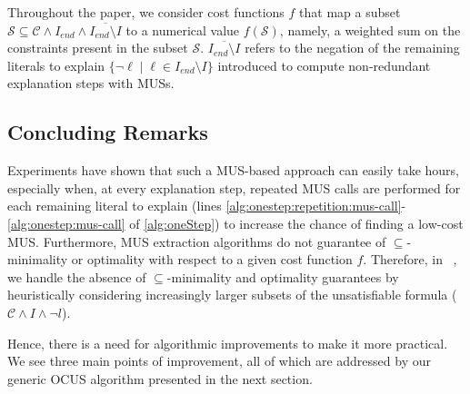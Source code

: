 \documentclass[twoside,11pt]{article}
\newcommand\citet[1]{\citeauthor{#1}~\citeyear{#1}}
\newcommand\m[1]{\mathcal{#1}}
\newcommand\Iend{\ensuremath{I_\mathit{end} }\xspace}
\newcommand\formulac{\ensuremath{\m{C} }\xspace}
\begin{document}
Throughout the paper, we consider cost functions $f$ that map a subset $\m{S} \subseteq \formulac \wedge \Iend \wedge \overline{\Iend \setminus I}$ to a numerical value $f(\m{S})$, namely, a weighted sum on the constraints present in the subset $\m{S}$.  $\overline{\Iend \setminus I} $ refers to the negation of the remaining literals to explain $\{\lnot \ell \mid \ell \in \Iend \setminus I\}$ introduced to compute non-redundant explanation steps with MUSs.




\subsection{Concluding Remarks}\label{sec:motivation:conluding-remarks}

Experiments have shown that such a MUS-based approach can easily take hours, especially when, at every explanation step, repeated MUS calls are performed for each remaining literal to explain (lines \ref{alg:onestep:repetition:mus-call}-\ref{alg:onestep:mus-call} of \cref{alg:oneStep}) to increase the chance of finding a low-cost MUS. 
Furthermore, MUS extraction algorithms do not guarantee of $\subseteq$-minimality or optimality with respect to a given cost function $f$. Therefore, in \citet{bogaerts2021framework}, we handle the absence of $\subseteq$-minimality and optimality guarantees by heuristically considering increasingly larger subsets of the unsatisfiable formula ($\formulac \land I \land \neg l$).

Hence, there is a need for algorithmic improvements to make it more practical.
We see three main points of improvement, all of which are addressed by our generic OCUS algorithm presented in the next section. 
\end{document}
